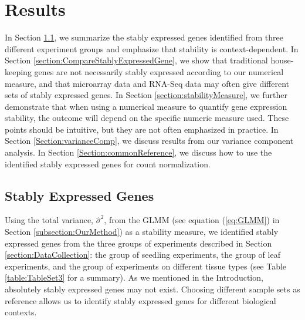 \documentclass[letterpaper,12pt]{article}
\begin{document}


\section{Results} \label{section:Results}
In Section \ref{section:stablyExpressedGene}, we summarize the stably expressed genes identified from three
different experiment groups and emphasize that stability is context-dependent.
 In Section \ref{section:CompareStablyExpressedGene}, we show that traditional house-keeping
genes are not necessarily stably expressed according to our numerical measure, 
and that microarray data and RNA-Seq data may often	 give different sets of stably
expressed genes.  In Section \ref{section:stabilityMeasure}, we further demonstrate that when using a
numerical measure to quantify gene expression stability, the outcome will
depend on the specific numeric measure used.  These points should be
intuitive, but they are not often emphasized in practice.  In Section
\ref{Section:varianceComp}, we discuss results from our variance component analysis. In Section
\ref{Section:commonReference}, we discuss how to use the identified stably
expressed genes for count normalization.

\subsection{Stably Expressed Genes}\label{section:stablyExpressedGene}
Using the total variance, $\hat\sigma^2$, from the GLMM (see
equation (\ref{eq:GLMM}) in Section \ref{subsection:OurMethod}) as a
stability measure, we identified stably expressed genes from the three groups
of experiments described in Section \ref{section:DataCollection}: the group of
seedling experiments, the group of leaf experiments, and the group of
experiments on different tissue types (see Table \ref{table:TableSet3} for a
summary).
As we mentioned in the Introduction, absolutely stably expressed genes may not
exist.  Choosing different sample sets as reference allows us to identify
stably expressed genes for different biological contexts.
\end{document}
